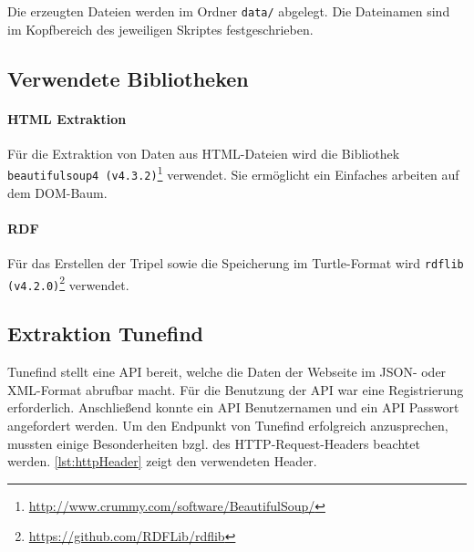 \documentclass[parskip]{scrartcl}
\begin{document}
Die erzeugten Dateien werden im Ordner \texttt{data/} abgelegt. Die Dateinamen sind im Kopfbereich des jeweiligen Skriptes festgeschrieben.

\subsection{Verwendete Bibliotheken}

\paragraph{HTML Extraktion}
Für die Extraktion von Daten aus HTML-Dateien wird die Bibliothek \texttt{beautifulsoup4  (v4.3.2)}\footnote{\href{http://www.crummy.com/software/BeautifulSoup/}{http://www.crummy.com/software/BeautifulSoup/}} verwendet. Sie ermöglicht ein Einfaches arbeiten auf dem DOM-Baum.

\paragraph{RDF}
Für das Erstellen der Tripel sowie die Speicherung im Turtle-Format wird \texttt{rdflib (v4.2.0)}\footnote{\href{https://github.com/RDFLib/rdflib}{https://github.com/RDFLib/rdflib}} verwendet. 

\subsection{Extraktion Tunefind}

Tunefind stellt eine API bereit, welche die Daten der Webseite im JSON- oder XML-Format abrufbar macht. Für die Benutzung der API war eine Registrierung erforderlich. Anschließend konnte ein API Benutzernamen und ein API Passwort angefordert werden.
Um den Endpunkt von Tunefind erfolgreich anzusprechen, mussten einige Besonderheiten bzgl. des HTTP-Request-Headers beachtet werden. \autoref{lst:httpHeader} zeigt den verwendeten Header.


\end{document}

